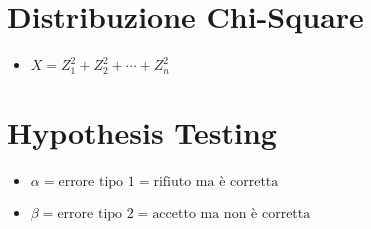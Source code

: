 \documentclass[a4paper,14pt,landscape]{extarticle}
\begin{document}
\begin{multicols*}{2}
    \section*{Distribuzione Chi-Square}
    \begin{itemize}
        \item $X = Z_1^2 + Z_2^2 + \cdots + Z_n^2$
    \end{itemize}

    \section*{Hypothesis Testing}
    \begin{itemize}
        \item $\alpha = \text{errore tipo 1} = \text{rifiuto ma è corretta}$
        \item $\beta = \text{errore tipo 2} = \text{accetto ma non è corretta}$
    \end{itemize}


\end{multicols*}
\end{document}

